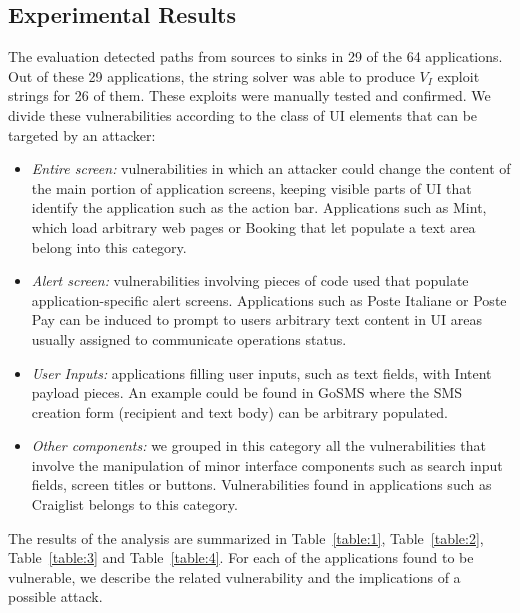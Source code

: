 \subsection{Experimental Results}
The evaluation detected paths from sources to sinks in 29 of the 64 applications. Out of these 29 applications, the string solver was able to produce $V_I$ exploit strings for 26 of them. {\color{orange} These exploits were manually tested and confirmed}.  We divide these vulnerabilities according to the class of UI elements that can be targeted by an attacker:
\begin{itemize}
    \item\emph{Entire screen:} vulnerabilities in which
        an attacker could change the content of the main portion of application screens, keeping
        visible parts of UI that identify the application such as the action bar.
        Applications such as Mint, which load arbitrary web pages or Booking that let populate a text area belong into this category.
    \item\emph{Alert screen:} vulnerabilities involving pieces of code used that populate application-specific alert screens. Applications such as Poste Italiane or Poste Pay can be induced to prompt to users arbitrary text content in UI areas usually
        assigned to communicate operations status.
    \item\emph{User Inputs:} applications filling user inputs, such as text fields, with Intent
        payload pieces. An example could be found in GoSMS where the
        SMS creation form (recipient and text body) can be arbitrary populated.
    \item\emph{Other components:} we grouped in this category all the vulnerabilities that involve
        the manipulation of minor interface components such as search input fields, screen titles or
        buttons. Vulnerabilities found in applications such as Craiglist belongs to this category.
\end{itemize}

The results of the analysis are summarized in Table~\ref{table:1}, Table~\ref{table:2}, Table~\ref{table:3}
 and Table~\ref{table:4}. For each of the applications found to be vulnerable, we describe the related vulnerability and the implications of a possible attack.


